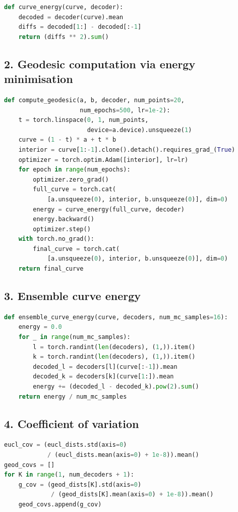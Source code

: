 \documentclass[10pt,a4paper]{article}
\begin{document}
\begin{lstlisting}[language=Python, caption={Curve energy (ensemble\_vae.py)}]
def curve_energy(curve, decoder):
    decoded = decoder(curve).mean
    diffs = decoded[1:] - decoded[:-1]
    return (diffs ** 2).sum()
\end{lstlisting}

\subsection*{2. Geodesic computation via energy minimisation}

\begin{lstlisting}[language=Python, caption={Geodesic optimisation (ensemble\_vae.py)}]
def compute_geodesic(a, b, decoder, num_points=20,
                     num_epochs=500, lr=1e-2):
    t = torch.linspace(0, 1, num_points,
                       device=a.device).unsqueeze(1)
    curve = (1 - t) * a + t * b
    interior = curve[1:-1].clone().detach().requires_grad_(True)
    optimizer = torch.optim.Adam([interior], lr=lr)
    for epoch in range(num_epochs):
        optimizer.zero_grad()
        full_curve = torch.cat(
            [a.unsqueeze(0), interior, b.unsqueeze(0)], dim=0)
        energy = curve_energy(full_curve, decoder)
        energy.backward()
        optimizer.step()
    with torch.no_grad():
        final_curve = torch.cat(
            [a.unsqueeze(0), interior, b.unsqueeze(0)], dim=0)
    return final_curve
\end{lstlisting}

\subsection*{3. Ensemble curve energy}

\begin{lstlisting}[language=Python, caption={Ensemble curve energy (ensemble\_vae.py)}]
def ensemble_curve_energy(curve, decoders, num_mc_samples=16):
    energy = 0.0
    for _ in range(num_mc_samples):
        l = torch.randint(len(decoders), (1,)).item()
        k = torch.randint(len(decoders), (1,)).item()
        decoded_l = decoders[l](curve[:-1]).mean
        decoded_k = decoders[k](curve[1:]).mean
        energy += (decoded_l - decoded_k).pow(2).sum()
    return energy / num_mc_samples
\end{lstlisting}

\subsection*{4. Coefficient of variation}

\begin{lstlisting}[language=Python, caption={CoV computation (ensemble\_vae.py)}]
eucl_cov = (eucl_dists.std(axis=0)
            / (eucl_dists.mean(axis=0) + 1e-8)).mean()
geod_covs = []
for K in range(1, num_decoders + 1):
    g_cov = (geod_dists[K].std(axis=0)
             / (geod_dists[K].mean(axis=0) + 1e-8)).mean()
    geod_covs.append(g_cov)
\end{lstlisting}

\newpage



\end{document}
